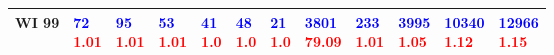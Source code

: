 \begin{tabular}{llllllllllll}
WI 99  &   \makecell{\textcolor{blue}{72} \\ \textcolor{red}{1.01}} &   \makecell{\textcolor{blue}{95} \\ \textcolor{red}{1.01}} &   \makecell{\textcolor{blue}{53} \\ \textcolor{red}{1.01}} &    \makecell{\textcolor{blue}{41} \\ \textcolor{red}{1.0}} &    \makecell{\textcolor{blue}{48} \\ \textcolor{red}{1.0}} &    \makecell{\textcolor{blue}{21} \\ \textcolor{red}{1.0}} &    \makecell{\textcolor{blue}{3801} \\ \textcolor{red}{79.09}} &   \makecell{\textcolor{blue}{233} \\ \textcolor{red}{1.01}} &   \makecell{\textcolor{blue}{3995} \\ \textcolor{red}{1.05}} &  \makecell{\textcolor{blue}{10340} \\ \textcolor{red}{1.12}} &  \makecell{\textcolor{blue}{12966} \\ \textcolor{red}{1.15}} \\
\bottomrule
\end{tabular}
